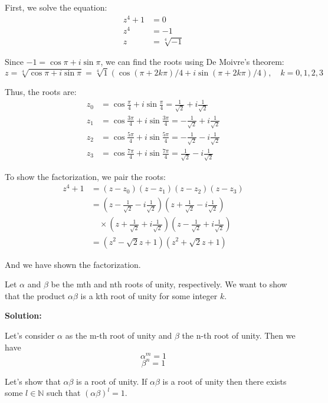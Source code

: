 First, we solve the equation:
\begin{align*}
z^4 + 1 &= 0 \\
z^4 &= -1 \\
z &= \sqrt[4]{-1}
\end{align*}

Since \( -1 = \cos \pi + i \sin \pi \), we can find the roots using De Moivre's theorem:
\[ z = \sqrt[4]{\cos \pi + i \sin \pi} = \sqrt[4]{1}(\cos (\pi + 2k\pi)/4 + i \sin (\pi + 2k\pi)/4), \quad k = 0,1,2,3 \]

Thus, the roots are:
\begin{align*}
z_0 &= \cos \frac{\pi}{4} + i \sin \frac{\pi}{4} = \frac{1}{\sqrt{2}} + i \frac{1}{\sqrt{2}} \\
z_1 &= \cos \frac{3\pi}{4} + i \sin \frac{3\pi}{4} = -\frac{1}{\sqrt{2}} + i \frac{1}{\sqrt{2}} \\
z_2 &= \cos \frac{5\pi}{4} + i \sin \frac{5\pi}{4} = -\frac{1}{\sqrt{2}} - i \frac{1}{\sqrt{2}} \\
z_3 &= \cos \frac{7\pi}{4} + i \sin \frac{7\pi}{4} = \frac{1}{\sqrt{2}} - i \frac{1}{\sqrt{2}}
\end{align*}

To show the factorization, we pair the roots:
\begin{align*}
z^4 + 1 &= (z - z_0)(z - z_1)(z - z_2)(z - z_3) \\
&= \left(z - \frac{1}{\sqrt{2}} - i \frac{1}{\sqrt{2}}\right)\left(z + \frac{1}{\sqrt{2}} - i \frac{1}{\sqrt{2}}\right) \\
&\quad \times \left(z + \frac{1}{\sqrt{2}} + i \frac{1}{\sqrt{2}}\right)\left(z - \frac{1}{\sqrt{2}} + i \frac{1}{\sqrt{2}}\right) \\
&= \left(z^2 - \sqrt{2}z + 1\right)\left(z^2 + \sqrt{2}z + 1\right)
\end{align*}

And we have shown the factorization.

\begin{exercise}
    Let \( \alpha \) and \( \beta \) be the mth and nth roots of unity, respectively. We want to show that the product \( \alpha\beta \) is a kth root of unity for some integer \( k \).
\end{exercise}
\textbf{Solution:}

Let's consider \( \alpha \) as the m-th root of unity and \( \beta \) the n-th root of unity. Then we have
\[ \alpha^m = 1 \]
\[ \beta^n = 1 \]

Let's show that \( \alpha\beta \) is a root of unity. If \( \alpha\beta \) is a root of unity then there exists some \( l \in \mathbb{N} \) such that \( (\alpha\beta)^l = 1 \).


